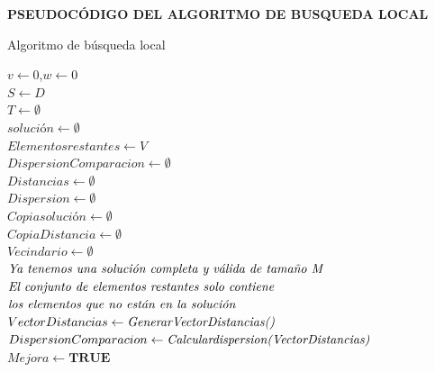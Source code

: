 \documentclass{article}
\begin{document}
\vspace{10mm}
\newpage
\maketitle \textbf{PSEUDOCÓDIGO DEL ALGORITMO DE BUSQUEDA LOCAL}
\begin{algorithm}[H]
  \scriptsize
  \label{Algoritmo Busqueda Local}
  \caption{Algoritmo de búsqueda local}
  $v \leftarrow 0 $,$ w\leftarrow 0 $\\
  $ S\leftarrow D $\\
  $T \leftarrow \emptyset $\\
$solución \leftarrow \emptyset$\\
$Elementos restantes \leftarrow V$\\
$Dispersion Comparacion \leftarrow \emptyset$\\
$Distancias \leftarrow \emptyset$\\
$Dispersion \leftarrow \emptyset$\\
\vspace{3mm}
$Copia solución \leftarrow \emptyset$\\
$Copia Distancia \leftarrow \emptyset$\\
$Vecindario \leftarrow \emptyset$\\
\vspace{3mm}
$\emph{Ya tenemos una solución completa y válida de tamaño M}$\\
$\emph{El conjunto de elementos restantes solo contiene}$\\
$\emph{los elementos que no están en la solución}$\\
\vspace{3mm}
$Vector Distancias \leftarrow{\emph{GenerarVectorDistancias()}}$\\
$Dispersion Comparacion \leftarrow{\emph{Calculardispersion(VectorDistancias)}}$\\
\vspace{3mm}
$Mejora \leftarrow {\textbf{TRUE}}$\\


\end{algorithm}
\end{document}
